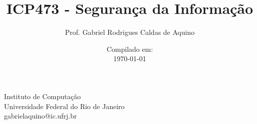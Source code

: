 \title{ICP473 - Segurança da Informação}

\author{Prof. Gabriel Rodrigues Caldas de Aquino}

\institute
{
    Instituto de Computação \\
    Universidade Federal do Rio de Janeiro\\
    gabrielaquino@ic.ufrj.br%
}
\date{Compilado em: \\ \today} %




\begin{frame}
    \titlepage
\end{frame}




